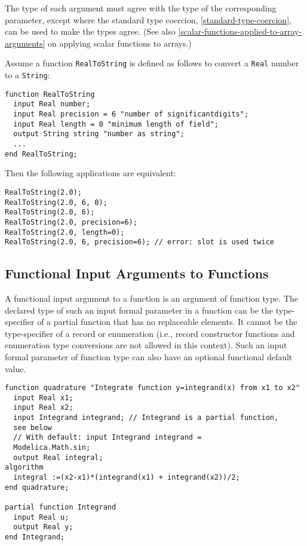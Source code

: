The type of each argument must agree with the type of the corresponding
parameter, except where the standard type coercion, \cref{standard-type-coercion}, can be used to make
the types agree. (See also \cref{scalar-functions-applied-to-array-arguments} on applying scalar functions
to arrays.)

\begin{example}
Assume a function \lstinline!RealToString! is defined as follows to
convert a \lstinline!Real! number to a \lstinline!String!:
\begin{lstlisting}[language=modelica]
function RealToString
  input Real number;
  input Real precision = 6 "number of significantdigits";
  input Real length = 0 "minimum length of field";
  output String string "number as string";
  ...
end RealToString;
\end{lstlisting}
Then the following applications are equivalent:
\begin{lstlisting}[language=modelica]
RealToString(2.0);
RealToString(2.0, 6, 0);
RealToString(2.0, 6);
RealToString(2.0, precision=6);
RealToString(2.0, length=0);
RealToString(2.0, 6, precision=6); // error: slot is used twice
\end{lstlisting}
\end{example}

\subsection{Functional Input Arguments to Functions}\label{functional-input-arguments-to-functions}

A functional input argument to a function is an argument of function
type. The declared type of such an input formal parameter in a function
can be the type-specifier of a partial function that has no replaceable
elements. It cannot be the type-specifier of a record or enumeration
(i.e., record constructor functions and enumeration type
conversions are not allowed in this context). Such an input formal
parameter of function type can also have an optional functional default
value.

\begin{example}
\begin{lstlisting}[language=modelica]
function quadrature "Integrate function y=integrand(x) from x1 to x2"
  input Real x1;
  input Real x2;
  input Integrand integrand; // Integrand is a partial function,
  see below
  // With default: input Integrand integrand =
  Modelica.Math.sin;
  output Real integral;
algorithm
  integral :=(x2-x1)*(integrand(x1) + integrand(x2))/2;
end quadrature;

partial function Integrand
  input Real u;
  output Real y;
end Integrand;
\end{lstlisting}
\end{example}

